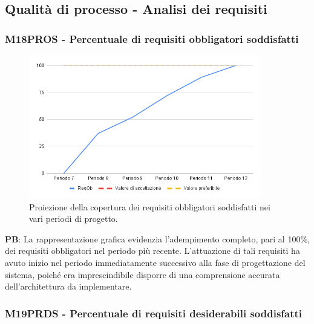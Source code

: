 \subsection{Qualità di processo - Analisi dei requisiti}

\vspace{0.3cm}

\subsubsection{M18PROS - Percentuale di requisiti obbligatori soddisfatti}

\vspace{0.3cm}

\begin{figure}[H]
    \centering
    \includegraphics[width=0.9\textwidth]{../Images/PianoDiQualifica/PROS.png}
    \caption{Proiezione della copertura dei requisiti obbligatori soddisfatti nei vari periodi di progetto.}
    \label{fig:10}
\end{figure}

\vspace{0.2cm}

\textbf{PB}: La rappresentazione grafica evidenzia l’adempimento completo, pari al 100\%, dei requisiti obbligatori nel periodo più recente. L’attuazione di tali requisiti ha avuto inizio nel periodo immediatamente successivo alla fase di progettazione del sistema, poiché era imprescindibile disporre di una comprensione accurata dell’architettura da implementare.

\subsubsection{M19PRDS - Percentuale di requisiti desiderabili soddisfatti}

\vspace{0.3cm}

